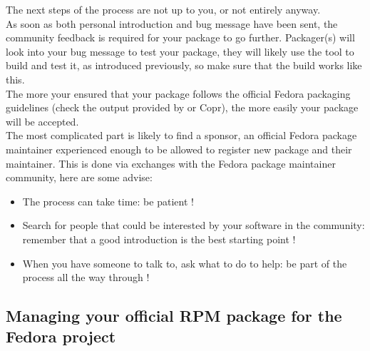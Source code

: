 The next steps of the process are not up to you, or not entirely anyway. \\
As soon as both personal introduction and bug message have been sent, the community feedback is required for your package 
to go further. 
Packager(s) will look into your bug message to test your package, they will likely use the  tool
to build and test it, as introduced previously, so make sure that the build works like this. \\
The more your ensured that your package follows the official Fedora packaging guidelines (check the output provided by  or Copr), 
the more easily your package will be accepted. \\[0.25cm] 
The most complicated part is likely to find a sponsor, an official Fedora package maintainer experienced enough to be allowed to register new package and their maintainer. 
This is done via exchanges with the Fedora package maintainer community, here are some advise: 
\begin{itemize}
\item The process can take time: be patient !
\item Search for people that could be interested by your software in the community: remember that a good introduction is the best starting point !
\item When you have someone to talk to, ask what to do to help: be part of the process all the way through !
\end{itemize}


\newpage
\subsection{Managing your official RPM package for the Fedora project}

